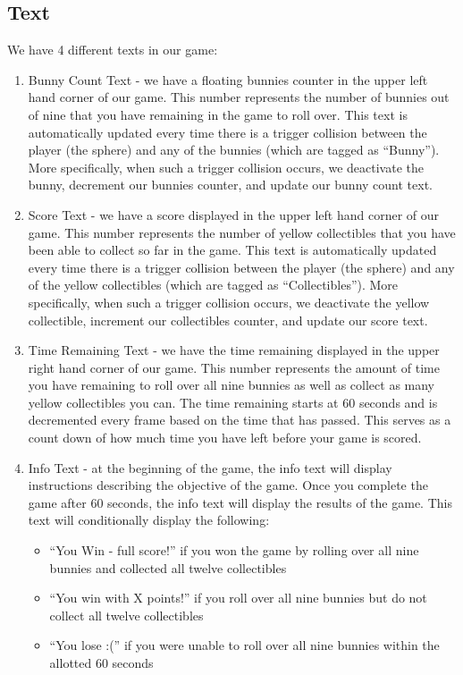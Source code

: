 \documentclass[12pt]{article}
\begin{document}
\subsection{Text}

We have 4 different texts in our game:

\begin{enumerate}
  \item Bunny Count Text - we have a floating bunnies counter in the upper left hand corner of our game. This number represents the number of bunnies out of nine that you have remaining in the game to roll over. This text is automatically updated every time there is a trigger collision between the player (the sphere) and any of the bunnies (which are tagged as ``Bunny''). More specifically, when such a trigger collision occurs, we deactivate the bunny, decrement our bunnies counter, and update our bunny count text.
  \item Score Text - we have a score displayed in the upper left hand corner of our game. This number represents the number of yellow collectibles that you have been able to collect so far in the game. This text is automatically updated every time there is a trigger collision between the player (the sphere) and any of the yellow collectibles (which are tagged as ``Collectibles''). More specifically, when such a trigger collision occurs, we deactivate the yellow collectible, increment our collectibles counter, and update our score text.
  \item Time Remaining Text - we have the time remaining displayed in the upper right hand corner of our game. This number represents the amount of time you have remaining to roll over all nine bunnies as well as collect as many yellow collectibles you can. The time remaining starts at 60 seconds and is decremented every frame based on the time that has passed. This serves as a count down of how much time you have left before your game is scored.
  \item Info Text - at the beginning of the game, the info text will display instructions describing the objective of the game. Once you complete the game after 60 seconds, the info text will display the results of the game. This text will conditionally display the following:
  \begin{itemize}
    \item ``You Win - full score!'' if you won the game by rolling over all nine bunnies and collected all twelve collectibles
    \item ``You win with X points!'' if you roll over all nine bunnies but do not collect all twelve collectibles
    \item ``You lose :('' if you were unable to roll over all nine bunnies within the allotted 60 seconds
  \end{itemize}
\end{enumerate}
\end{document}
